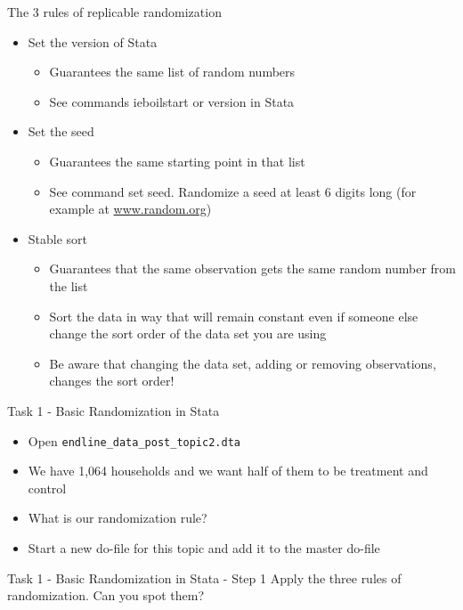 \documentclass[aspectratio=169]{beamer}
\newcommand{\codeexample}[2]{
	\begin{figure}
		\VerbatimInput[
		framesep=3mm,
		frame=lines, %
		numbers=left, %
		label= #1, %
		baselinestretch=0.90, %
		]{#2} %
	\end{figure}
	\FloatBarrier
}
\begin{document}
\begin{frame}{The 3 rules of replicable randomization}
	\begin{itemize}
		\item Set the version of Stata
		\begin{itemize}
			\item Guarantees the same list of random numbers
			\item See commands ieboilstart or version in Stata
		\end{itemize}
		\item Set the seed
		\begin{itemize}
			\item Guarantees the same starting point in that list
			\item See command set seed. Randomize a seed at least 6 digits long (for example at \url{www.random.org})
		\end{itemize}
		\item Stable sort
		\begin{itemize}
			\item Guarantees that the same observation gets the same random number from the list
			\item Sort the data in way that will remain constant even if someone else change the sort order of the data set you are using
			\item Be aware that changing the data set, adding or removing observations, changes the sort order!
		\end{itemize}
	\end{itemize}
\end{frame}



\begin{frame}{Task 1 - Basic Randomization in Stata}
	\begin{itemize}
		\item Open \texttt{endline\_data\_post\_topic2.dta}
		\item We have 1,064 households and we want half of them to be treatment and control
		\item What is our randomization rule?
		\item Start a new do-file for this topic and add it to the master do-file
	\end{itemize}
\end{frame}

\begin{frame}{Task 1 - Basic Randomization in Stata - Step 1}
	Apply the three rules of randomization. Can you spot them?
	\codeexample{randomization-1.do}{code/randomization-1.do}
\end{frame}
\end{document}
